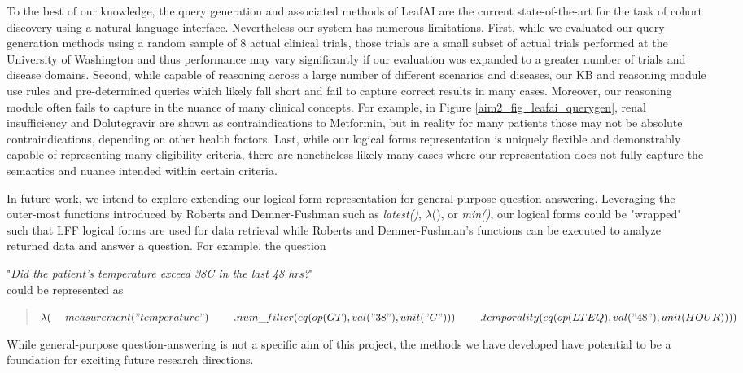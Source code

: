 \documentclass[../main.tex]{subfiles}
\begin{document}
To the best of our knowledge, the query generation and associated methods of LeafAI are the current state-of-the-art for the task of cohort discovery using a natural language interface. Nevertheless our system has numerous limitations. First, while we evaluated our query generation methods using a random sample of 8 actual clinical trials, those trials are a small subset of actual trials performed at the University of Washington and thus performance may vary significantly if our evaluation was expanded to a greater number of trials and disease domains. Second, while capable of reasoning across a large number of different scenarios and diseases, our KB and reasoning module use rules and pre-determined queries which likely fall short and fail to capture correct results in many cases. Moreover, our reasoning module often fails to capture in the nuance of many clinical concepts. For example, in Figure \ref{aim2_fig_leafai_querygen}, renal insufficiency and Dolutegravir are shown as contraindications to Metformin, but in reality for many patients those may not be absolute contraindications, depending on other health factors. Last, while our logical forms representation is uniquely flexible and demonstrably capable of representing many eligibility criteria, there are nonetheless likely many cases where our representation does not fully capture the semantics and nuance intended within certain criteria.

In future work, we intend to explore extending our logical form representation for general-purpose question-answering. Leveraging the outer-most functions introduced by Roberts and Demner-Fushman \cite{roberts2016annotating} such as \textit{latest()}, $\lambda$(), or \textit{min()}, our logical forms could be "wrapped" such that LFF logical forms are used for data retrieval while Roberts and Demner-Fushman's functions can be executed to analyze returned data and answer a question. For example, the question 

"\textit{Did the patient’s temperature exceed 38C in the last 48 hrs?}" \\

\noindent could be represented as \\

\begin{quote}
$\lambda( \\
    \mathrm{\ \ \ \ }measurement("temperature") \\
    \mathrm{\ \ \ \ \ \ \ }.num\_filter(eq(op(GT), val("38"), unit("C")))\\
    \mathrm{\ \ \ \ \ \ \ }.temporality(eq(op(LTEQ), val("48"), unit(HOUR))) \\
)$
\end{quote}

While general-purpose question-answering is not a specific aim of this project, the methods we have developed have potential to be a foundation for exciting future research directions. 
\end{document}
